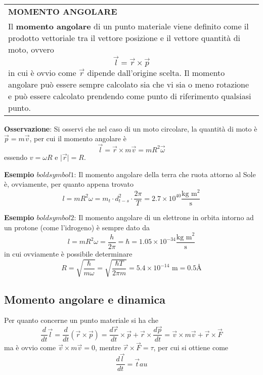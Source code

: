 \documentclass[a4paper]{extarticle}
\renewcommand\arraystretch{}
\begin{document}
\vspace{1em}
\setlength{\tabcolsep}{14pt}
\renewcommand{\arraystretch}{2}
\noindent
\begin{tabularx}{\textwidth}{@{}|P|@{}}
    \hline
    {\textbf{MOMENTO ANGOLARE}}\\
    \parbox{\linewidth}{Il \textbf{momento angolare} di un punto materiale viene definito come il prodotto vettoriale tra il vettore posizione e il vettore quantità di moto, ovvero
    \[\boxed{\vec l = \vec r \times \vec p}\]
    in cui è ovvio come $\vec r$ dipende dall'origine scelta. Il momento angolare può essere sempre calcolato sia che vi sia o meno rotazione e può essere calcolato prendendo come punto di riferimento qualsiasi punto.
    \vspace{3mm}}\\
    \hline
\end{tabularx}

\vspace{1em}
\noindent
\textbf{Osservazione}: Si osservi che nel caso di un moto circolare, la quantità di moto è $\vec p = m \vec v$, per cui il momento angolare è
\[\vec l = \vec r \times m \vec v = mR^2 \vec \omega\]
essendo $v=\omega R$ e $\vert \vec r \vert = R$.

\vspace{1em}
\noindent
\textbf{Esempio $boldsymbol{1}$}: Il momento angolare della terra che ruota attorno al Sole è, ovviamente, per quanto appena trovato
\[l=mR^2 \omega = m_t \cdot d_{t-s}^2 \cdot \frac{2\pi}{T} = 2.7 \times 10^{40} \frac{\text{kg m}^2}{\text{s}}\]

\vspace{1em}
\noindent
\textbf{Esempio $boldsymbol{2}$}: Il momento angolare di un elettrone in orbita intorno ad un protone (come l'idrogeno) è sempre dato da
\[l=m R^2 \omega=\frac{h}{2\pi}=\hbar= 1.05 \times 10^{-34} \frac{\text{kg m}^2}{\text{s}}\]
in cui ovviamente è possibile determinare
\[R=\sqrt{\frac{\hbar}{m \omega}}=\sqrt{\frac{\hbar T}{2\pi m}}=5.4 \times 10^{-14} \text{ m} = 0.5 \text{\AA}\]

\vspace{1em}
\subsection{Momento angolare e dinamica}
Per quanto concerne un punto materiale si ha che
\[\frac{d}{dt} \vec l = \frac{d}{dt}(\vec r \times \vec p) = \frac{d \vec r}{dt} \times \vec p + \vec r \times \frac{d \vec p}{dt} = \vec v \times m \vec v + \vec r \times \vec F\]
ma è ovvio come $\vec v \times m \vec v = 0$, mentre $\vec r \times \vec F = \tau$, per cui si ottiene come
\[\frac{d \vec l}{dt}=\vec tau\]
\end{document}
